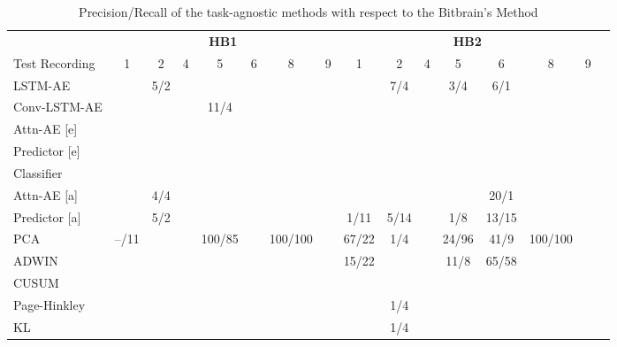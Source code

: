 \begin{table}[btp]
\centering
\caption{Precision/Recall of the task-agnostic methods with respect to the Bitbrain's Method}
\label{tab3}

\begin{tabular}{lccccccccccccccc}
\toprule
          & \multicolumn{7}{c}{\textbf{HB1}} & \multicolumn{7}{c}{\textbf{HB2}} \\
\cmidrule(lr){2-8}\cmidrule(lr){9-15}
Test Recording & 1 & 2 & 4 & 5 & 6 & 8 & 9 & 1 & 2 & 4 & 5 & 6 & 8 & 9 \\
\cmidrule(lr){2-8}\cmidrule(lr){9-15}
LSTM-AE  && 5/2 &       &       &       &       &       &       &  7/4 &       &  3/4 &  6/1 &       &         \\
Conv-LSTM-AE&&     &       & 11/4 &       &       &       &       &       &       &       &       &       &         \\
\midrule
Attn-AE [e]&&     &       &       &       &       &       &       &       &       &       &       &       &         \\
Predictor [e]  &&     &       &       &       &       &       &       &       &       &       &       &       &         \\
Classifier  &&     &       &       &       &       &       &       &       &       &       &       &       &         \\
\midrule
Attn-AE [a]&&  4/4&       &       &       &       &       &       &       &       &       & 20/1 &       &         \\
Predictor [a]  && 5/2   &       &       &       &       &       &  1/11 &  5/14 &       &  1/8 & 13/15 &       &         \\
\midrule
PCA      & --/11 &     &       &  100/85  &       &  100/100  &       & 67/22 &  1/4 &       & 24/96 & 41/9 &  100/100  &         \\
ADWIN      &   &     &       &     &       &     &       & 15/22 &   &       & 11/8 & 65/58 &   &         \\
CUSUM      &   &     &       &    &       &    &       &  &    &       &   &  &   &         \\
Page-Hinkley      &   &     &       &    &       &    &       &   &  1/4 &       &  &  &    &         \\
KL      &   &     &       &    &       &    &       &   &  1/4 &       &  &  &    &         \\
\bottomrule
\end{tabular}

\end{table}

